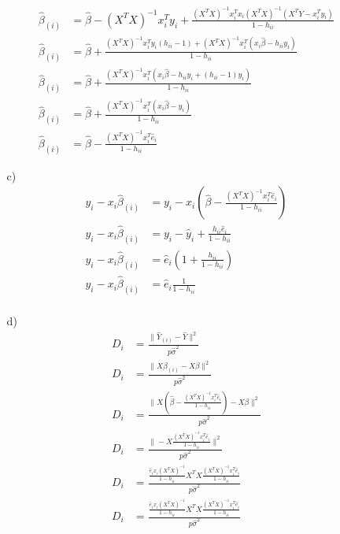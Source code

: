 \documentclass[11pt]{article}
\theoremstyle{definition}
\begin{document}
\begin{itemize}
\begin{itemize}
\begin{align*}
                    \hat \beta_{(i)} &= \hat \beta - (X^TX)^{-1}x_i^Ty_i + \frac{(X^TX)^{-1}x_i^Tx_i(X^TX)^{-1}\left(X^TY - x_i^T y_i\right)}{1-h_{ii}}   \\
                    \hat \beta_{(i)} &= \hat \beta + \frac{(X^TX)^{-1}x_i^Ty_i(h_{ii}-1) +(X^TX)^{-1}x_i^T\left(x_i\hat\beta - h_{ii}y_i\right)}{1-h_{ii}}   \\
                    \hat \beta_{(i)} &= \hat \beta + \frac{(X^TX)^{-1}x_i^T\left(x_i\hat\beta - h_{ii}y_i + (h_{ii}-1)y_i\right)}{1-h_{ii}}   \\
                    \hat \beta_{(i)} &= \hat \beta + \frac{(X^TX)^{-1}x_i^T\left(x_i\hat\beta - y_i\right)}{1-h_{ii}} \\
                    \hat \beta_{(i)} &= \hat \beta - \frac{(X^TX)^{-1}x_i^T\hat e_i}{1-h_{ii}}   
                \end{align*}
            \item[c)]
                \begin{align*}
                    y_i - x_i\hat\beta_{(i)} &= y_i- x_i\left(\hat \beta - \frac{(X^TX)^{-1}x_i^T\hat e_i}{1-h_{ii}}\right) \\
                    y_i - x_i\hat\beta_{(i)} &= y_i  - \hat y_i + \frac{h_{ii}\hat e_i}{1-h_{ii}} \\
                    y_i - x_i\hat\beta_{(i)} &= \hat e_i \left(1+ \frac{h_{ii}}{1-h_{ii}}\right) \\
                    y_i - x_i\hat\beta_{(i)} &= \hat e_i \frac{1}{1-h_{ii}} \\
                \end{align*}
            \item[d)]
                \begin{align*}
                    D_i &= \frac{\|\hat Y_{(i)} - \hat Y\|^2}{p\hat\sigma^2} \\
                    D_i &= \frac{\|X\beta_{(i)} - X\beta\|^2}{p\hat\sigma^2} \\
                    D_i &= \frac{\|X\left(\hat \beta - \frac{(X^TX)^{-1}x_i^T\hat e_i}{1-h_{ii}}\right) - X\beta\|^2}{p\hat\sigma^2} \\
                    D_i &= \frac{\|- X\frac{(X^TX)^{-1}x_i^T\hat e_i}{1-h_{ii}}\|^2}{p\hat\sigma^2} \\
                    D_i &= \frac{\frac{\hat e_ix_i(X^TX)^{-1}}{1-h_{ii}}X^TX\frac{(X^TX)^{-1}x_i^T\hat e_i}{1-h_{ii}}}{p\hat\sigma^2} \\
                    D_i &= \frac{\frac{\hat e_ix_i(X^TX)^{-1}}{1-h_{ii}}X^TX\frac{(X^TX)^{-1}x_i^T\hat e_i}{1-h_{ii}}}{p\hat\sigma^2} \\

\end{align*}
\end{itemize}
\end{itemize}
\end{document}
